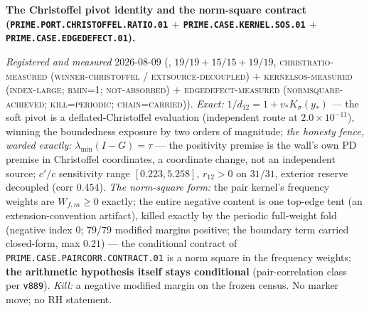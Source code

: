 \par\smallskip\noindent\textbf{The Christoffel pivot identity
and the norm-square contract
(\texttt{PRIME.PORT.CHRISTOFFEL.\allowbreak RATIO.01} $+$
\texttt{PRIME.CASE.KERNEL.\allowbreak SOS.01} $+$
\texttt{PRIME.CASE.\allowbreak EDGEDEFECT.01}).}
{\sloppy
\emph{Registered and measured} 2026-08-09
(, $19/19 + 15/15 +
19/19$, \textsc{christratio-measured (winner-christoffel /
extsource-decoupled)} $+$ \textsc{kernelsos-measured
(index-large; rmin=1; not-absorbed)} $+$
\textsc{edgedefect-measured (normsquare-achieved;
kill=periodic; chain=carried)}).  \emph{Exact:} $1/d_{12} = 1 +
v_{*} K_\sigma(y_{*})$ --- the soft pivot is a
deflated-Christoffel evaluation (independent route at
$2.0\times10^{-11}$), winning the boundedness exposure by two
orders of magnitude; \emph{the honesty fence, warded exactly:}
$\lambda_{\min}(I - G) = \tau$ --- the positivity premise is
the wall's own PD premise in Christoffel coordinates, a
coordinate change, not an independent source; $c'/c$
sensitivity range $[0.223, 5.258]$, $r_{12} > 0$ on $31/31$,
exterior reserve decoupled (corr $0.454$).  \emph{The
norm-square form:} the pair kernel's frequency weights are
$W_{f,m} \ge 0$ exactly; the entire negative content is one
top-edge tent (an extension-convention artifact), killed
exactly by the periodic full-weight fold (negative index $0$;
$79/79$ modified margins positive; the boundary term carried
closed-form, max $0.21$) --- the conditional contract of
\texttt{PRIME.CASE.PAIRCORR.CONTRACT.01} is a norm square in
the frequency weights; \textbf{the arithmetic hypothesis itself
stays conditional} (pair-correlation class per \texttt{v889}).
\emph{Kill:} a negative modified margin on the frozen census.
No marker move; no RH statement.\par}


